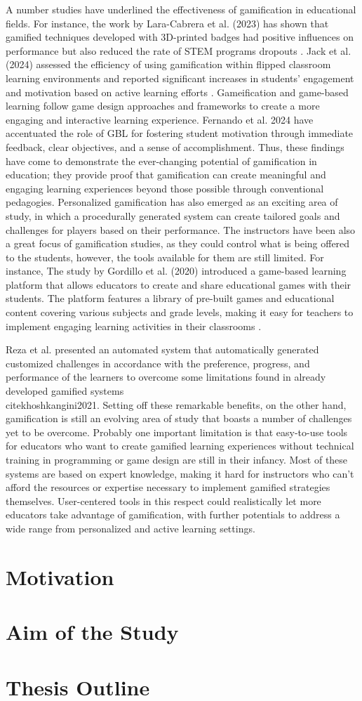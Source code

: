 A number studies have underlined the effectiveness of gamification in educational fields. For instance, the work by Lara-Cabrera et al. (2023) has shown that gamified techniques developed with 3D-printed badges had positive influences on performance but also reduced the rate of STEM programs dropouts \cite{lara2023badges}. Jack et al. (2024) assessed the efficiency of using gamification within flipped classroom learning environments and reported significant increases in students' engagement and motivation based on active learning efforts \cite{jack2024gamification}. Gameification and game-based learning follow game design approaches and frameworks to create a more engaging and interactive learning experience. Fernando et al. 2024 have accentuated the role of GBL for fostering student motivation through immediate feedback, clear objectives, and a sense of accomplishment. Thus, these findings have come to demonstrate the ever-changing potential of gamification in education; they provide proof that gamification can create meaningful and engaging learning experiences beyond those possible through conventional pedagogies. Personalized gamification has also emerged as an exciting area of study, in which a procedurally generated system can create tailored goals and challenges for players based on their performance. The instructors have been also a great focus of gamification studies, as they could control what is being offered to the students, however, the tools available for them are still limited. For instance, The study by Gordillo et al. (2020) introduced a game-based learning platform that allows educators to create and share educational games with their students. The platform features a library of pre-built games and educational content covering various subjects and grade levels, making it easy for teachers to implement engaging learning activities in their classrooms \cite{sgame2020}.

Reza et al. presented an automated system that automatically generated customized challenges in accordance with the preference, progress, and performance of the learners to overcome some limitations found in already developed gamified systems \\cite{khoshkangini2021}. Setting off these remarkable benefits, on the other hand, gamification is still an evolving area of study that boasts a number of challenges yet to be overcome. Probably one important limitation is that easy-to-use tools for educators who want to create gamified learning experiences without technical training in programming or game design are still in their infancy. Most of these systems are based on expert knowledge, making it hard for instructors who can't afford the resources or expertise necessary to implement gamified strategies themselves. User-centered tools in this respect could realistically let more educators take advantage of gamification, with further potentials to address a wide range from personalized and active learning settings.

\section{Motivation}

\section{Aim of the Study}

\section{Thesis Outline}